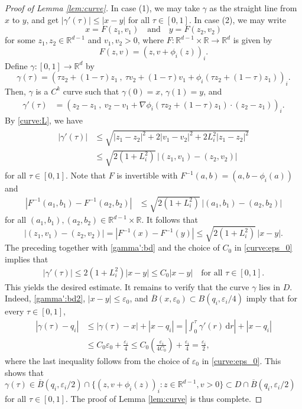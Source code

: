 \documentclass[reqno]{amsart}
\newcommand{\R}{\mathbb R}
\renewcommand{\d}{\mathrm d}
\newcommand{\1}{\mathbf 1}
\numberwithin{equation}{section}
\theoremstyle{definition}
\begin{document}
\begin{proof}[Proof of Lemma \ref{lem:curve}]
In case (1), we may take $\gamma$ as the straight line from $x$ to $y$, and get $|\gamma'(\tau)| \le |x-y|$ for all $\tau \in [0,1]$.
In case (2), we may write 
\[
	x = F(z_1,v_1) \quad \text{and} \quad 
	y = F(z_2,v_2)
\]
for some $z_1, z_2 \in \R^{d-1}$ and $v_1,v_2>0$, where $F: \R^{d-1} \times \R \to \R^d$ is given by
\[
	F(z,v) = (z, v+ \phi_i(z))_i.
\]
Define $\gamma: [0,1] \to \R^d$ by
\[
	\gamma(\tau) = (\tau z_2+(1-\tau)z_1 \ ,\  \tau v_2+(1-\tau)v_1 + \phi_i(\tau z_2+(1-\tau)z_1))_i.
\]
Then, $\gamma$ is a $C^k$ curve such that $\gamma(0) = x$, $\gamma(1)=y$, and
\begin{align*}
	\gamma'(\tau) &= ( z_2-z_1\ , \ v_2-v_1 + \nabla \phi_i(\tau z_2+(1-\tau)z_1) \cdot (z_2-z_1) )_i.
\end{align*}
By \eqref{curve:L}, we have
\begin{align}\begin{split}\label{gamma':bd}
	|\gamma'(\tau)| &\le \sqrt{ |z_1-z_2|^2 + 2|v_1-v_2|^2+2L_i^2 |z_1-z_2|^2}\\
	& \le \sqrt{2(1+L_i^2)}\, |(z_1,v_1)-(z_2,v_2)|
\end{split}\end{align}
for all $\tau \in [0,1]$.
Note that $F$ is invertible with $F^{-1}(a,b) = (a,b-\phi_i(a))$ and
\begin{align*}
	|F^{-1}(a_1,b_1) - F^{-1}(a_2,b_2)|
	&\le \sqrt{2(1+L_i^2)}\, |(a_1,b_1)-(a_2,b_2)|
\end{align*}
for all $(a_1,b_1), (a_2,b_2) \in \R^{d-1} \times \R$.
It follows that
\[
	|(z_1,v_1)-(z_2,v_2)| = |F^{-1}(x)-F^{-1}(y)| \le \sqrt{2(1+L_i^2)} \, |x-y|.
\]
The preceding together with \eqref{gamma':bd} and the choice of $C_0$ in \eqref{curve:eps_0} implies that
\begin{align}\label{gamma':bd2}
	|\gamma'(\tau)| \le 2(1+L_i^2) |x-y| \le C_0|x-y| \quad \text{for all $\tau \in [0,1]$.}
\end{align}
This yields the desired estimate.
It remains to verify that the curve $\gamma$ lies in $D$.
Indeed, \eqref{gamma':bd2}, $|x-y| \le \varepsilon_0$, and $\overline{B}(x,\varepsilon_0) \subset B(q_i,\varepsilon_i/4)$ imply that for every $\tau \in [0,1]$, 
\begin{align*}
	|\gamma(\tau)-q_i| &\le |\gamma(\tau)-x| + |x-q_i| = \left|\int_0^\tau \gamma'(r) \, \d r\right| + |x-q_i|\\
	&\le C_0 \varepsilon_0 + \frac{\varepsilon_i}{4}
	\le C_0\left(\frac{\varepsilon_i}{4C_0}\right) + \frac{\varepsilon_i}{4} = \frac{\varepsilon_i}{2},
\end{align*}
where the last inequality follows from the choice of $\varepsilon_0$ in \eqref{curve:eps_0}. This shows that $\gamma(\tau) \in \overline{B}(q_i,\varepsilon_i/2) \cap \{ (z,v+\phi_i(z))_i : z \in \R^{d-1}, v>0 \} \subset D \cap \overline{B}(q_i,\varepsilon_i/2)$ for all $\tau \in [0,1]$.
The proof of Lemma \ref{lem:curve} is thus complete.
\end{proof}
\end{document}
